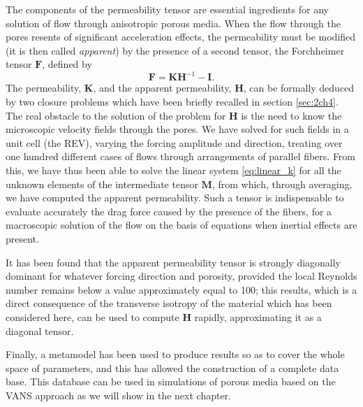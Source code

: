The components of the permeability tensor are essential ingredients for any solution of flow
through anisotropic porous media.  When the flow through the pores resents of significant
acceleration effects, the permeability must be modified (it is then called \emph{apparent}) by the presence
of a second tensor, the Forchheimer tensor $\mathbf{F}$, defined by   
$$
\mathbf{F} =  \mathbf{K} \mathbf{H}^{-1} - \mathbf{I}.
$$
The permeability, $\mathbf{K}$, and the apparent permeability, $\mathbf{H}$, can be formally deduced by two closure problems which have
been briefly recalled in section \ref{sec:2ch4}.  The real obstacle to the solution of the problem for $\mathbf{H}$ is the need
to know the microscopic velocity fields through the pores. We have solved for such fields 
in a unit cell (the REV), varying the forcing amplitude and direction, treating over one
hundred different cases of flows through arrangements of parallel fibers. From this, we have
thus been able to solve the linear system \eqref{eq:linear_k} for all the unknown elements of the 
intermediate tensor  
$\mathbf{M}$, from which, through averaging, we have computed the apparent permeability.  Such a tensor
is  indispensable to evaluate accurately the drag force caused by the presence of the fibers, for a macroscopic solution of the flow on the
basis of equations \citet{whitaker2013method} when inertial effects are present.

It has been found that the apparent permeability tensor is strongly diagonally dominant for whatever
forcing direction and porosity,  provided the local Reynolds number remains below a value 
approximately equal to 100; this results, which is a direct
consequence of the transverse isotropy of the material which has been considered here, 
can be used to compute $\mathbf{H}$ rapidly, approximating it as a diagonal tensor.

Finally, a metamodel has been used to produce results so as to cover the whole space of parameters,
and this has allowed the construction of a complete data base. This database can be used in simulations of porous media based on the VANS approach as we will show in the next chapter.

